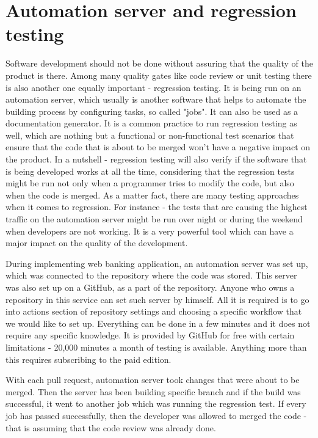 \documentclass[a4paper,12pt]{book}
\newcommand\tab[1][1cm]{\hspace*{#1}}
\begin{document}
\section{Automation server and regression testing}
{
\tab Software development should not be done without assuring that the quality of the product is there. Among many quality gates like code review or unit testing there is also another one equally important - regression testing. It is being run on an automation server, which usually is another software that helps to automate the building process by configuring tasks, so called "jobs". It can also be used as a documentation generator. It is a common practice to run regression testing as well, which are nothing but a functional or non-functional test scenarios that ensure that the code that is about to be merged won't have a negative impact on the product. In a nutshell - regression testing will also verify if the software that is being developed works at all the time, considering that the regression tests might be run not only when a programmer tries to modify the code, but also when the code is merged. As a matter fact, there are many testing approaches when it comes to regression. For instance - the tests that are causing the highest traffic on the automation server might be run over night or during the weekend when developers are not working. It is a very powerful tool which can have a major impact on the quality of the development.

\bigskip During implementing web banking application, an automation server was set up, which was connected to the repository where the code was stored. This server was also set up on a GitHub, as a part of the repository. Anyone who owns a repository in this service can set such server by himself. All it is required is to go into actions section of repository settings and choosing a specific workflow that we would like to set up. Everything can be done in a few minutes and it does not require any specific knowledge. It is provided by GitHub for free with certain limitations - 20,000 minutes a month of testing is available. Anything more than this requires subscribing to the paid edition.  

\bigskip With each pull request, automation server took changes that were about to be merged. Then the server has been building specific branch and if the build was successful, it went to another job which was running the regression test. If every job has passed successfully, then the developer was allowed to merged the code - that is assuming that the code review was already done.

}
\end{document}
